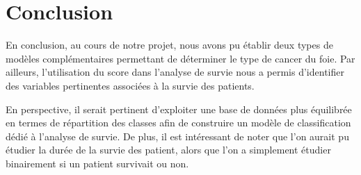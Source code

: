 \chapter{Conclusion}
\label{ch:Conclusion} 


En conclusion, au cours de notre projet, nous avons pu établir deux types de modèles complémentaires permettant de déterminer le type de cancer du foie. 
Par ailleurs, l’utilisation du score dans l’analyse de survie nous a permis d’identifier des variables pertinentes associées à la survie des patients. 

En perspective, il serait pertinent d’exploiter une base de données plus équilibrée en termes de répartition des classes afin de construire un modèle de classification dédié à l’analyse de survie.
De plus, il est intéressant de noter que l'on aurait pu étudier la durée de la survie des patient, alors que l'on a simplement étudier binairement si un patient survivait ou non.

